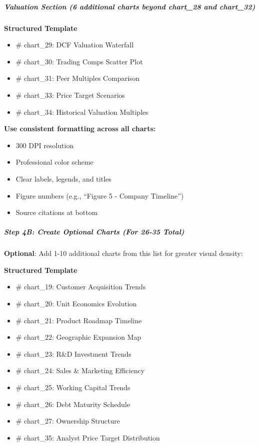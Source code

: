 \documentclass[11pt]{article}
\begin{document}
\subparagraph{Valuation Section (6 additional charts beyond chart\_\allowbreak{}28 and chart\_\allowbreak{}32)}\mbox{}\par
\textbf{Structured Template}
\begin{itemize}[leftmargin=*,itemsep=2pt,topsep=2pt]
\item {} \# chart\_\allowbreak{}29: DCF Valuation Waterfall
\item {} \# chart\_\allowbreak{}30: Trading Comps Scatter Plot
\item {} \# chart\_\allowbreak{}31: Peer Multiples Comparison
\item {} \# chart\_\allowbreak{}33: Price Target Scenarios
\item {} \# chart\_\allowbreak{}34: Historical Valuation Multiples
\end{itemize}

\textbf{Use consistent formatting across all charts:}

\begin{itemize}[leftmargin=*,itemsep=2pt,topsep=2pt]
\item {} 300 DPI resolution
\item {} Professional color scheme
\item {} Clear labels, legends, and titles
\item {} Figure numbers (e.g., ``Figure 5 - Company Timeline'')
\item {} Source citations at bottom
\end{itemize}

\subparagraph{Step 4B: Create Optional Charts (For 26-35 Total)}\mbox{}\par

\textbf{Optional}: Add 1-10 additional charts from this list for greater visual density:


\textbf{Structured Template}
\begin{itemize}[leftmargin=*,itemsep=2pt,topsep=2pt]
\item {} \# chart\_\allowbreak{}19: Customer Acquisition Trends
\item {} \# chart\_\allowbreak{}20: Unit Economics Evolution
\item {} \# chart\_\allowbreak{}21: Product Roadmap Timeline
\item {} \# chart\_\allowbreak{}22: Geographic Expansion Map
\item {} \# chart\_\allowbreak{}23: R\&D Investment Trends
\item {} \# chart\_\allowbreak{}24: Sales \& Marketing Efficiency
\item {} \# chart\_\allowbreak{}25: Working Capital Trends
\item {} \# chart\_\allowbreak{}26: Debt Maturity Schedule
\item {} \# chart\_\allowbreak{}27: Ownership Structure
\item {} \# chart\_\allowbreak{}35: Analyst Price Target Distribution
\end{itemize}
\end{document}
